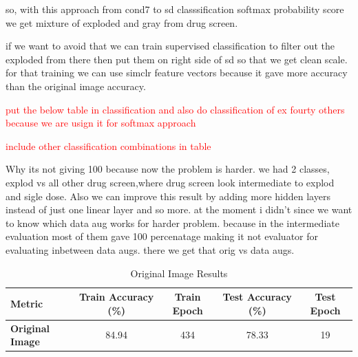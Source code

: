 so, with this approach from cond7 to sd classsification softmax probability score we get mixture of exploded and gray from drug screen.

if we want to avoid that we can train supervised classification to filter out the exploded from there then put them on right side of sd so that we get clean scale.
for that training we can use simclr feature vectors because it gave more accuracy than the original image accuracy.

\textcolor{red}{put the below table in classification and also do classification of ex fourty others because we are usign it for softmax approach} 

\begin{table}[H]
  \centering
  \caption{Performance metrics for different augmentation strategies before the projection head.}
  \label{tab:augmentation}
\end{table}

\textcolor{red}{include other classification combinations in table}

Why its not giving 100 because now the problem is harder. we had 2 classes, explod vs all other drug screen,where drug screen look intermediate to explod and sigle dose.
Also we can improve this result by adding more hidden layers instead of just one linear layer and so more. at the moment i didn't since we want to know which data aug works for harder problem.
because in the intermediate evaluation  most of them gave 100 percenatage making it not  evaluator for evaluating inbetween data augs. there we get that orig vs data augs.

\begin{table}[h!]
  \centering
  \caption{Original Image Results}
  \label{tab:original_image_results}
  \begin{tabular}{lcccc}
  \toprule
  \textbf{Metric}         & \textbf{Train Accuracy (\%)} & \textbf{Train Epoch} & \textbf{Test Accuracy (\%)} & \textbf{Test Epoch} \\ \midrule
  \textbf{Original Image} & 84.94                        & 434                   & 78.33                        & 19                  \\ 
  \bottomrule
  \end{tabular}
\end{table}


